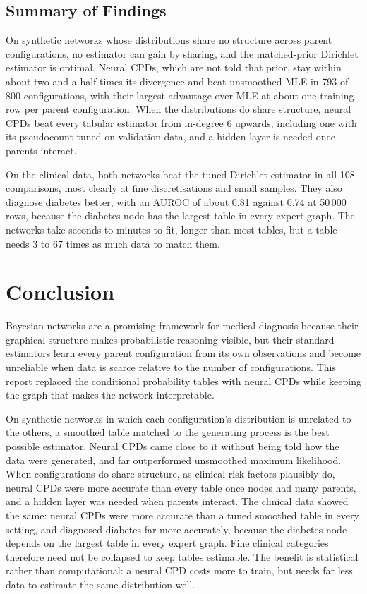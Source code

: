 \documentclass[a4paper,fleqn]{cas-dc}
\begin{document}
\subsection{Summary of Findings}

On synthetic networks whose distributions share no structure across parent configurations, no estimator can gain by sharing, and the matched-prior Dirichlet estimator is optimal. Neural CPDs, which are not told that prior, stay within about two and a half times its divergence and beat unsmoothed MLE in 793 of 800 configurations, with their largest advantage over MLE at about one training row per parent configuration. When the distributions do share structure, neural CPDs beat every tabular estimator from in-degree 6 upwards, including one with its pseudocount tuned on validation data, and a hidden layer is needed once parents interact.

On the clinical data, both networks beat the tuned Dirichlet estimator in all 108 comparisons, most clearly at fine discretisations and small samples. They also diagnose diabetes better, with an AUROC of about 0.81 against 0.74 at 50\,000 rows, because the diabetes node has the largest table in every expert graph. The networks take seconds to minutes to fit, longer than most tables, but a table needs 3 to 67 times as much data to match them.

\section{Conclusion}\label{sec:conclusion}

Bayesian networks are a promising framework for medical diagnosis because their graphical structure makes probabilistic reasoning visible, but their standard estimators learn every parent configuration from its own observations and become unreliable when data is scarce relative to the number of configurations. This report replaced the conditional probability tables with neural CPDs while keeping the graph that makes the network interpretable.

On synthetic networks in which each configuration's distribution is unrelated to the others, a smoothed table matched to the generating process is the best possible estimator. Neural CPDs came close to it without being told how the data were generated, and far outperformed unsmoothed maximum likelihood. When configurations do share structure, as clinical risk factors plausibly do, neural CPDs were more accurate than every table once nodes had many parents, and a hidden layer was needed when parents interact. The clinical data showed the same: neural CPDs were more accurate than a tuned smoothed table in every setting, and diagnosed diabetes far more accurately, because the diabetes node depends on the largest table in every expert graph. Fine clinical categories therefore need not be collapsed to keep tables estimable. The benefit is statistical rather than computational: a neural CPD costs more to train, but needs far less data to estimate the same distribution well.
\end{document}
